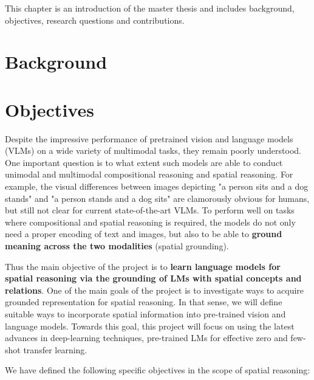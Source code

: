 This chapter is an introduction of the master thesis and includes background, objectives, research questions and contributions.

\section{Background}

\section{Objectives}

Despite the impressive performance of pretrained vision and language models (VLMs) on a wide variety of multimodal tasks, they remain poorly understood. One important question is to what extent such models are able to conduct unimodal and multimodal compositional reasoning and spatial reasoning. For example, the visual differences between images depicting "a person sits and a dog stands" and "a person stands and a dog sits" are clamorously obvious for humans, but still not clear for current state-of-the-art VLMs. To perform well on tasks where compositional and spatial reasoning is required, the models do not only need a proper encoding of text and images, but also to be able to \textbf{ground meaning across the two modalities} (spatial grounding).

Thus the main objective of the project is to \textbf{learn language models for spatial reasoning via the grounding of LMs with spatial concepts and relations}. One of the main goals of the project is to investigate ways to acquire grounded representation for spatial reasoning. In that sense, we will define suitable ways to incorporate spatial information into pre-trained vision and language models. Towards this goal, this project will focus on using the latest advances in deep-learning techniques, pre-trained LMs for effective zero and few-shot transfer learning.

We have defined the following specific objectives in the scope of spatial reasoning:

